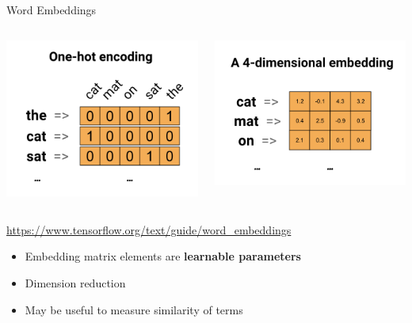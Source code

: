 \documentclass[ignorenonframetext,xcolor=x11names]{beamer}
\begin{document}
\begin{frame}{Word Embeddings}
\begin{columns}
\begin{column}{.5\textwidth}
\includegraphics[width=\textwidth]{one-hot.png}
\end{column}
\begin{column}{.5\textwidth}
\includegraphics[width=\textwidth]{embedding2.png}
\end{column}
\end{columns}
\begin{center}
\vspace{\baselineskip}
\scriptsize \url{https://www.tensorflow.org/text/guide/word_embeddings}\normalsize
\vspace{\baselineskip}
\end{center}
\begin{itemize}
   \item Embedding matrix elements are \textbf{learnable parameters}
   \item Dimension reduction
   \item May be useful to measure similarity of terms
\end{itemize}
\end{frame}
\end{document}
